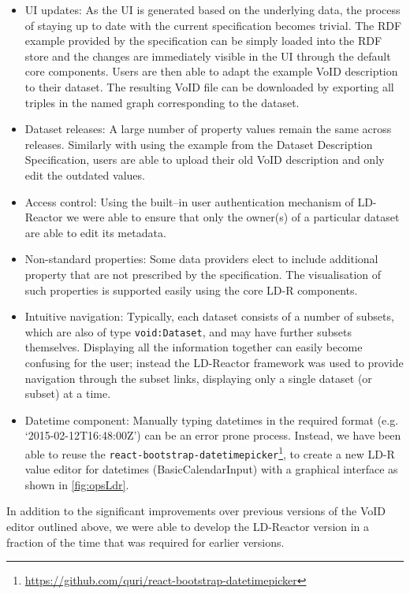 \documentclass{acm_proc_article-sp}
\begin{document}
\begin{itemize}
	\item UI updates: As the UI is generated based on the underlying data, the process of staying up to date with the current specification becomes trivial. The RDF example provided by the specification can be simply loaded into the RDF store and the changes are immediately visible in the UI through the default core components. Users are then able to adapt the example VoID description to their dataset. The resulting VoID file can be downloaded by exporting all triples in the named graph corresponding to the dataset.
	\item Dataset releases: A large number of property values remain the same across releases. Similarly with using the example from the Dataset Description Specification, users are able to upload their old VoID description and only edit the outdated values.
	\item Access control: Using the built--in user authentication mechanism of LD-Reactor we were able to ensure that only the owner(s) of a particular dataset are able to edit its metadata.
	\item Non-standard properties: Some data providers elect to include additional property that are not prescribed by the specification. The visualisation of such properties is supported easily using the core LD-R components.
	\item Intuitive navigation: Typically, each dataset consists of a number of subsets, which are also of type \texttt{void:Dataset}, and may have further subsets themselves. Displaying all the information together can easily become confusing for the user; instead the LD-Reactor framework was used to provide navigation through the subset links, displaying only a single dataset (or subset) at a time.
	\item Datetime component: Manually typing datetimes in the required format (e.g. `2015-02-12T16:48:00Z') can be an error prone process. Instead, we have been able to reuse the \texttt{react-bootstrap-datetimepicker}\footnote{\url{https://github.com/quri/react-bootstrap-datetimepicker}}, to create a new LD-R value editor for datetimes (BasicCalendarInput) with a graphical interface as shown in \autoref{fig:opsLdr}.
\end{itemize}

In addition to the significant improvements over previous versions of the VoID editor outlined above, we were able to develop the LD-Reactor version in a fraction of the time that was required for earlier versions.
\end{document}
